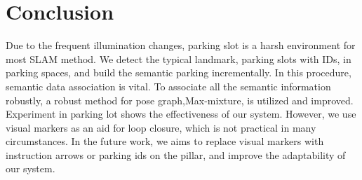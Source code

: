 \documentclass[journal]{IEEEtran}
\begin{document}




\section{Conclusion}
Due to the frequent illumination changes, parking slot is a harsh environment for most SLAM method.
We detect the typical landmark, parking slots with IDs, in parking spaces, and build the semantic parking incrementally.
In this procedure, semantic data association is vital.
To associate all the semantic information robustly, a robust method for pose graph,Max-mixture, is utilized and improved.
Experiment in parking lot shows the effectiveness of our system.
However, we use visual markers as an aid for loop closure, which is not practical in many circumstances.
In the future work, we aims to replace visual markers with instruction arrows or parking ids on the pillar, and improve the adaptability of our system.


%
\end{document}

